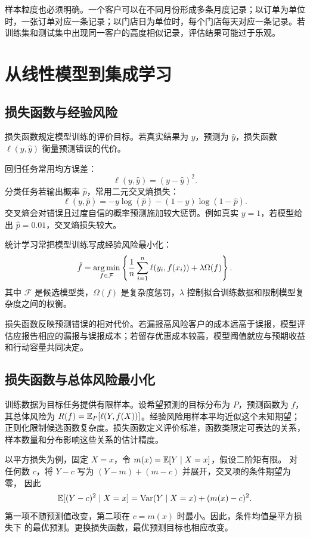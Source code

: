 样本粒度也必须明确。一个客户可以在不同月份形成多条月度记录；以订单为单位时，一张订单对应一条记录；以门店日为单位时，每个门店每天对应一条记录。若训练集和测试集中出现同一客户的高度相似记录，评估结果可能过于乐观。

\section{从线性模型到集成学习}
\subsection{损失函数与经验风险}

损失函数规定模型训练的评价目标。若真实结果为 \(y\)，预测为 \(\hat y\)，损失函数 \(\ell(y,\hat y)\) 衡量预测错误的代价。

回归任务常用均方误差：
\[
  \ell(y,\hat y)=(y-\hat y)^2.
\]
分类任务若输出概率 \(\hat p\)，常用二元交叉熵损失：
\[
  \ell(y,\hat p)
  =
  -y\log(\hat p)-(1-y)\log(1-\hat p).
\]
交叉熵会对错误且过度自信的概率预测施加较大惩罚。例如真实 \(y=1\)，若模型给出 \(\hat p=0.01\)，交叉熵损失较大。

统计学习常把模型训练写成经验风险最小化：
\[
  \hat f
  =
  \operatorname*{arg\,min}_{f\in\mathcal F}
  \left\{
  \frac{1}{n}\sum_{i=1}^{n}\ell(y_i,f(x_i))
  +
  \lambda\Omega(f)\right\}.
\]
其中 \(\mathcal F\) 是候选模型类，\(\Omega(f)\) 是复杂度惩罚，\(\lambda\) 控制拟合训练数据和限制模型复杂度之间的权衡。

\begin{modernbox}[管理解释]
损失函数反映预测错误的相对代价。若漏报高风险客户的成本远高于误报，模型评估应报告相应的漏报与误报成本；若留存优惠成本较高，模型阈值就应与预期收益和行动容量共同决定。
\end{modernbox}

\subsection{损失函数与总体风险最小化}
训练数据为目标任务提供有限样本。设希望预测的目标分布为 \(P\)，预测函数为 \(f\)，
其总体风险为 \(R(f)=\mathbb E_P[\ell(Y,f(X))]\)。经验风险用样本平均近似这个未知期望；
正则化限制候选函数复杂度。损失函数定义评价标准，函数类限定可表达的关系，
样本数量和分布影响这些关系的估计精度。

以平方损失为例，固定 \(X=x\)，令 \(m(x)=\mathbb E[Y\mid X=x]\)，假设二阶矩有限。
对任何数 \(c\)，将 \(Y-c\) 写为 \((Y-m)+(m-c)\) 并展开，交叉项的条件期望为零，
因此
\begin{equation}
\mathbb E[(Y-c)^2\mid X=x]
=\operatorname{Var}(Y\mid X=x)+(m(x)-c)^2.
\label{eq:conditional-square-loss}
\end{equation}
第一项不随预测值改变，第二项在 \(c=m(x)\) 时最小。因此，条件均值是平方损失下
的最优预测。更换损失函数，最优预测目标也相应改变。


